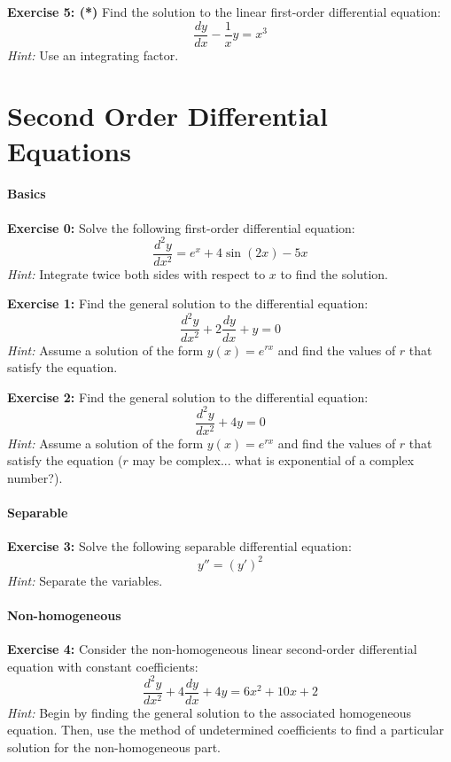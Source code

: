 \documentclass[]{article}
\begin{document}
	\textbf{Exercise 5: (*)}
	Find the solution to the linear first-order differential equation:
	\[
	\frac{dy}{dx} - \frac{1}{x}y = x^3
	\]
	\textit{Hint:} Use an integrating factor.
	
	
	
	\section{Second Order Differential Equations}
	\paragraph{Basics}\mbox{}
	
	\textbf{Exercise 0:}
	Solve the following first-order differential equation:
	\[
	\frac{d^2y}{dx^2} = e^x + 4\sin(2x) - 5x
	\]
	\textit{Hint:} Integrate twice both sides with respect to \(x\) to find the solution.
	
	\textbf{Exercise 1:}
	Find the general solution to the differential equation:
	\[
	\frac{d^2y}{dx^2} + 2\frac{dy}{dx} + y = 0
	\]
	\textit{Hint:} Assume a solution of the form \(y(x) = e^{rx}\) and find the values of \(r\) that satisfy the equation.
	
	\textbf{Exercise 2:}
	Find the general solution to the differential equation:
	\[
	\frac{d^2y}{dx^2} + 4y = 0
	\]
	\textit{Hint:} Assume a solution of the form \(y(x) = e^{rx}\) and find the values of \(r\) that satisfy the equation ($r$ may be complex... what is exponential of a complex number?).
	
	\paragraph{Separable}\mbox{}
	
	\textbf{Exercise 3:}
	Solve the following separable differential equation:
	$$y'' = (y')^2$$
	\textit{Hint:} Separate the variables.
	
	\paragraph{Non-homogeneous}\mbox{}
	
	\textbf{Exercise 4:}
	Consider the non-homogeneous linear second-order differential equation with constant coefficients:
	\[
	\frac{d^2y}{dx^2} + 4\frac{dy}{dx} + 4y = 6x^2 + 10x + 2
	\]
	\textit{Hint:} Begin by finding the general solution to the associated homogeneous equation. Then, use the method of undetermined coefficients to find a particular solution for the non-homogeneous part.
	
\end{document}
